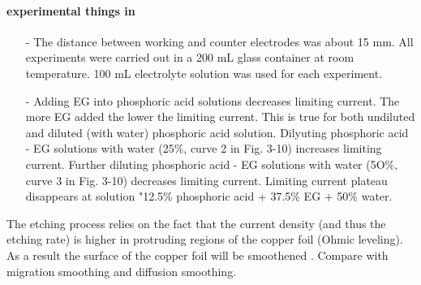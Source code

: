 \paragraph{experimental things in \cite{jinshan_electrochemical_2004}}
\begin{itemize}
 \item[-]The distance between working and counter electrodes was about 15 mm. All experiments were carried out in a 200 mL glass container at room temperature. 100 mL electrolyte solution was used for each experiment.
 \item[-]Adding EG into phosphoric acid solutions decreases limiting current. The more EG added the lower the limiting current. This is true for both undiluted and diluted (with water) phosphoric acid solution. Dilyuting phosphoric acid - EG solutions with water (25\%, curve 2 in Fig. 3-10) increases limiting current. Further diluting phosphoric acid - EG solutions with water (5O\%, curve 3 in Fig. 3-10) decreases limiting current. Limiting current plateau disappears at solution "12.5\% phosphoric acid + 37.5\% EG + 50\% water.
\end{itemize}
The etching process relies on the fact that the current density (and thus the etching rate) is higher in protruding regions of the copper foil (Ohmic leveling).  As a result the surface of the copper foil will be smoothened \cite{luo_effect_2011}. Compare with migration smoothing and diffusion smoothing\cite{jinshan_electrochemical_2004}.

